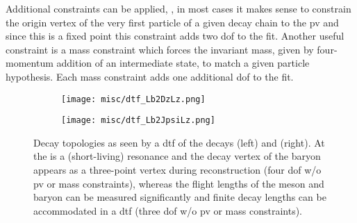 Additional constraints can be applied, \eg{}, in most cases it makes sense to constrain the origin vertex of the very first particle of a given decay chain to the \gls{pv} and since this is a fixed point this constraint adds two \gls{dof} to the fit.
Another useful constraint is a mass constraint which forces the invariant mass, given by four-momentum addition of an intermediate state, to match a given particle hypothesis.
Each mass constraint adds one additional \gls{dof} to the fit.
\begin{figure}[htbp]
    \centering
    \begin{subfigure}{.49\textwidth}
        \centering
        \texttt{[image: misc/dtf\_Lb2DzLz.png]}
        \caption{\decay{\Lb}{\Dz\Lz}}
    \end{subfigure}
    \begin{subfigure}{.49\textwidth}
        \centering
        \texttt{[image: misc/dtf\_Lb2JpsiLz.png]}
        \caption{\decay{\Lb}{\jpsi\Lz}}
    \end{subfigure}
    \caption{Decay topologies as seen by a \gls{dtf} of the decays \decay{\Lb}{\Dz\Lz} (left) and \decay{\Lb}{\jpsi\Lz} (right). At \lhcb the \jpsi is a (short-living) resonance and the decay vertex of the \Lb baryon appears as a three-point vertex \decay{\Lb}{\ellp\ellm\Lz} during reconstruction (four \gls{dof} w/o \gls{pv} or mass constraints), whereas the flight lengths of the \Dz meson and \Lz baryon can be measured significantly and finite decay lengths can be accommodated in a \gls{dtf} (three \gls{dof} w/o \gls{pv} or mass constraints).}
    \label{fig:detector_decaytops}
\end{figure}

